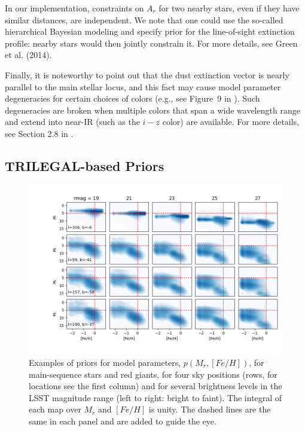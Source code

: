 In our implementation, constraints on $A_r$ for two nearby stars, even if they have similar distances,
are independent. We note that one could use the so-called hierarchical Bayesian modeling  and specify prior
for the line-of-sight extinction profile: nearby stars would then jointly constrain it. For more
details, see Green et al. (2014).

Finally, it is noteworthy to point out that the dust extinction vector is nearly parallel to the main stellar locus,
and this fact may cause model parameter degeneracies for certain choices of colors (e.g., see Figure~9 in
\citealt{2012ApJ...757..166B}). Such degeneracies are broken when multiple colors that span a wide
wavelength range and extend into near-IR (such as the $i-z$ color) are available. For more details, see
Section 2.8 in \cite{2012ApJ...757..166B}.


\subsection{TRILEGAL-based Priors} 

\begin{figure}[t!]
\hskip -0.5in
\includegraphics[width=1.07\textwidth,angle=0]{figures/Stripe82priorMosaic.png}
\vskip -0.4in  
\caption{Examples of priors for model parameters, $p(M_r, [Fe/H])$, for main-sequence stars and red giants,
  for four sky positions (rows, for locations see the first column) and for several brightness levels in the LSST
  magnitude range (left to right: bright to faint). The integral of each map over $M_r$ and $[Fe/H]$ is unity. 
  The dashed lines are the same in each panel and are added to guide the eye. 
}
\label{fig:priorsAstroLab}
\end{figure}


